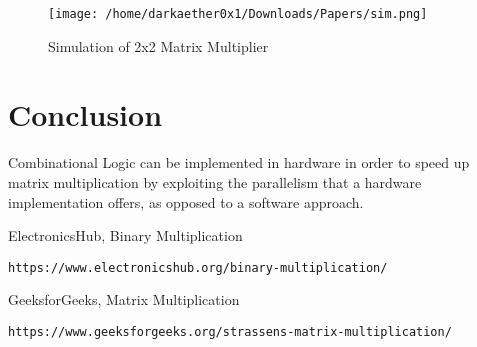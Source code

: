 \documentclass[12pt]{report}
\begin{document}
\begin{figure}[htp]
\centering
\texttt{[image: /home/darkaether0x1/Downloads/Papers/sim.png]}
\caption{Simulation of 2x2 Matrix Multiplier}
\label{}
\end{figure}
\vfill
\clearpage
\section{Conclusion}
Combinational Logic can be implemented in hardware in order to speed up matrix multiplication by exploiting the parallelism that a hardware implementation offers, as opposed to a software approach.
\begin{thebibliography}{999}

  ElectronicsHub, Binary Multiplication
  \begin{verbatim}https://www.electronicshub.org/binary-multiplication/\end{verbatim}
  GeeksforGeeks, Matrix Multiplication
  \begin{verbatim}https://www.geeksforgeeks.org/strassens-matrix-multiplication/\end{verbatim}
\end{thebibliography}
\end{document}

